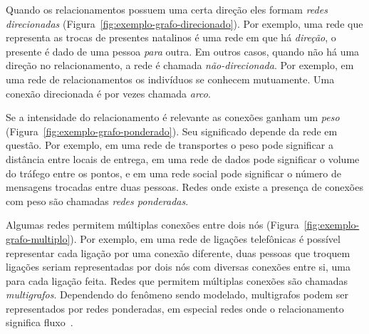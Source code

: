 \documentclass[12pt,a4paper]{article}
\begin{document}
Quando os relacionamentos possuem uma certa direção eles formam \textit{redes direcionadas} (Figura~\ref{fig:exemplo-grafo-direcionado}). Por exemplo, uma rede que representa as trocas de presentes natalinos é uma rede em que há \textit{direção}, o presente é dado de uma pessoa \textit{para} outra. Em outros casos, quando não há uma direção no relacionamento, a rede é chamada \textit{não-direcionada}. Por exemplo, em uma rede de relacionamentos os indivíduos se conhecem mutuamente. Uma conexão direcionada é por vezes chamada \textit{arco}.

Se a intensidade do relacionamento é relevante as conexões ganham um \textit{peso} (Figura~\ref{fig:exemplo-grafo-ponderado}). Seu significado depende da rede em questão. Por exemplo, em uma rede de transportes o peso pode significar a distância entre locais de entrega, em uma rede de dados pode significar o volume do tráfego entre os pontos, e em uma rede social pode significar o número de mensagens trocadas entre duas pessoas. Redes onde existe a presença de conexões com peso são chamadas \textit{redes ponderadas}.

Algumas redes permitem múltiplas conexões entre dois nós (Figura~\ref{fig:exemplo-grafo-multiplo}). Por exemplo, em uma rede de ligações telefônicas é possível representar cada ligação por uma conexão diferente, duas pessoas que troquem ligações seriam representadas por dois nós com diversas conexões entre si, uma para cada ligação feita. Redes que permitem múltiplas conexões são chamadas \textit{multigrafos}. Dependendo do fenômeno sendo modelado, multigrafos podem ser representados por redes ponderadas, em especial redes onde o relacionamento significa fluxo~\cite{Newman2004-by}.
\end{document}
